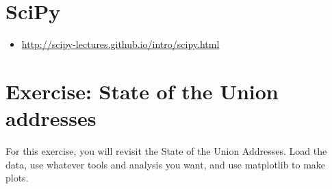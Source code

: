 \section{SciPy}

\begin{itemize}
\item \url{http://scipy-lectures.github.io/intro/scipy.html}
\end{itemize}

\section{Exercise: State of the Union addresses}

For this exercise, you will revisit the State of the Union Addresses.
Load the data, use whatever tools and analysis you want, and use matplotlib
to make plots.
